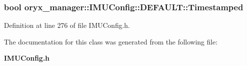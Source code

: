 \subsubsection[{\-Timestamped}]{\setlength{\rightskip}{0pt plus 5cm}bool {\bf oryx\-\_\-manager\-::\-I\-M\-U\-Config\-::\-D\-E\-F\-A\-U\-L\-T\-::\-Timestamped}}\label{classoryx__manager_1_1IMUConfig_1_1DEFAULT_a30a8021920f41671f84078148075196e}


\-Definition at line 276 of file \-I\-M\-U\-Config.\-h.



\-The documentation for this class was generated from the following file\-:\begin{DoxyCompactItemize}
\item 
{\bf \-I\-M\-U\-Config.\-h}\end{DoxyCompactItemize}

